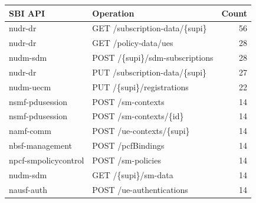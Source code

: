 \begin{tabular}{llr}
\toprule
SBI API & Operation & Count \\
\midrule
nudr-dr & GET /subscription-data/\{supi\} & 56 \\
nudr-dr & GET /policy-data/ues & 28 \\
nudm-sdm & POST /\{supi\}/sdm-subscriptions & 28 \\
nudr-dr & PUT /subscription-data/\{supi\} & 27 \\
nudm-uecm & PUT /\{supi\}/registrations & 22 \\
nsmf-pdusession & POST /sm-contexts & 14 \\
nsmf-pdusession & POST /sm-contexts/\{id\} & 14 \\
namf-comm & POST /ue-contexts/\{supi\} & 14 \\
nbsf-management & POST /pcfBindings & 14 \\
npcf-smpolicycontrol & POST /sm-policies & 14 \\
nudm-sdm & GET /\{supi\}/sm-data & 14 \\
nausf-auth & POST /ue-authentications & 14 \\
\bottomrule
\end{tabular}
